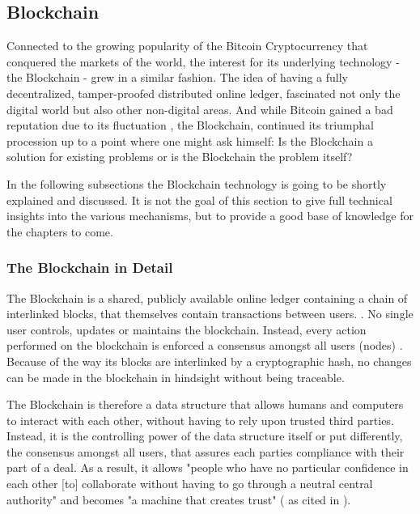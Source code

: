 \subsection{Blockchain}
\label{subsec:02_blockchain}

Connected to the growing popularity of the Bitcoin Cryptocurrency that conquered the markets of the world, the interest for its underlying technology - the Blockchain - grew in a similar fashion. The idea of having a fully decentralized, tamper-proofed distributed online ledger, fascinated not only the digital world but also other non-digital areas. And while Bitcoin gained a bad reputation due to its fluctuation \cite{Shackelford2016}, the Blockchain, continued its triumphal procession up to a point where one might ask himself: Is the Blockchain a solution for existing problems or is the Blockchain the problem itself? \cite{Stinchcombe2017} \cite{Nielsen2018} \cite{Lunn2015}

In the following subsections the Blockchain technology is going to be shortly  explained and discussed. It is not the goal of this section to give full technical insights into the various mechanisms, but to provide a good base of knowledge for the chapters to come.

\subsubsection{The Blockchain in Detail}
The Blockchain is a shared, publicly available online ledger containing a chain of interlinked blocks, that themselves contain transactions between users. \cite{Wust2017}. No single user controls, updates or maintains the blockchain. Instead, every action performed on the blockchain is enforced a consensus amongst all users (nodes) \cite{Shackelford2016}. Because of the way its blocks are interlinked by a cryptographic hash, no changes can be made in the blockchain in hindsight without being traceable.

The Blockchain is therefore a data structure that allows humans and computers to interact with each other, without having to rely upon trusted third parties. Instead, it is the controlling power of the data structure itself or put differently, the consensus amongst all users, that assures each parties compliance with their part of a deal. As a result, it allows "people who have no particular confidence in each other [to] collaborate without having to go through a neutral central authority" and becomes "a machine that creates trust" (\cite{Economist2015} as cited in \cite{Shackelford2016}).
